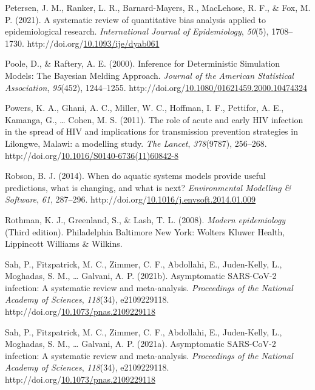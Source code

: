 \documentclass[12pt,twoside]{smiththesis}
\newlength{\cslhangindent}
\newenvironment{CSLReferences}[2] %
 {%
\setlength{\parindent}{0pt}
\ifodd #1 \everypar{\setlength{\hangindent}{\cslhangindent}}\ignorespaces\fi
\ifnum #2 > 0
\setlength{\parskip}{#2\baselineskip}
  \fi
}%
{}
\begin{document}
\begin{CSLReferences}{1}{0}
\leavevmode{}%
Petersen, J. M., Ranker, L. R., Barnard-Mayers, R., MacLehose, R. F., \& Fox, M. P. (2021). A systematic review of quantitative bias analysis applied to epidemiological research. \emph{International Journal of Epidemiology}, \emph{50}(5), 1708--1730. http://doi.org/\href{https://doi.org/10.1093/ije/dyab061}{10.1093/ije/dyab061}

\leavevmode{}%
Poole, D., \& Raftery, A. E. (2000). Inference for Deterministic Simulation Models: The Bayesian Melding Approach. \emph{Journal of the American Statistical Association}, \emph{95}(452), 1244--1255. http://doi.org/\href{https://doi.org/10.1080/01621459.2000.10474324}{10.1080/01621459.2000.10474324}

\leavevmode{}%
Powers, K. A., Ghani, A. C., Miller, W. C., Hoffman, I. F., Pettifor, A. E., Kamanga, G., \ldots{} Cohen, M. S. (2011). The role of acute and early HIV infection in the spread of HIV and implications for transmission prevention strategies in Lilongwe, Malawi: a modelling study. \emph{The Lancet}, \emph{378}(9787), 256--268. http://doi.org/\href{https://doi.org/10.1016/S0140-6736(11)60842-8}{10.1016/S0140-6736(11)60842-8}

\leavevmode{}%
Robson, B. J. (2014). When do aquatic systems models provide useful predictions, what is changing, and what is next? \emph{Environmental Modelling \& Software}, \emph{61}, 287--296. http://doi.org/\href{https://doi.org/10.1016/j.envsoft.2014.01.009}{10.1016/j.envsoft.2014.01.009}

\leavevmode{}%
Rothman, K. J., Greenland, S., \& Lash, T. L. (2008). \emph{Modern epidemiology} (Third edition). Philadelphia Baltimore New York: Wolters Kluwer Health, Lippincott Williams \& Wilkins.

\leavevmode{}%
Sah, P., Fitzpatrick, M. C., Zimmer, C. F., Abdollahi, E., Juden-Kelly, L., Moghadas, S. M., \ldots{} Galvani, A. P. (2021b). Asymptomatic SARS-CoV-2 infection: A systematic review and meta-analysis. \emph{Proceedings of the National Academy of Sciences}, \emph{118}(34), e2109229118. http://doi.org/\href{https://doi.org/10.1073/pnas.2109229118}{10.1073/pnas.2109229118}

\leavevmode{}%
Sah, P., Fitzpatrick, M. C., Zimmer, C. F., Abdollahi, E., Juden-Kelly, L., Moghadas, S. M., \ldots{} Galvani, A. P. (2021a). Asymptomatic SARS-CoV-2 infection: A systematic review and meta-analysis. \emph{Proceedings of the National Academy of Sciences}, \emph{118}(34), e2109229118. http://doi.org/\href{https://doi.org/10.1073/pnas.2109229118}{10.1073/pnas.2109229118}


\end{CSLReferences}
\end{document}
